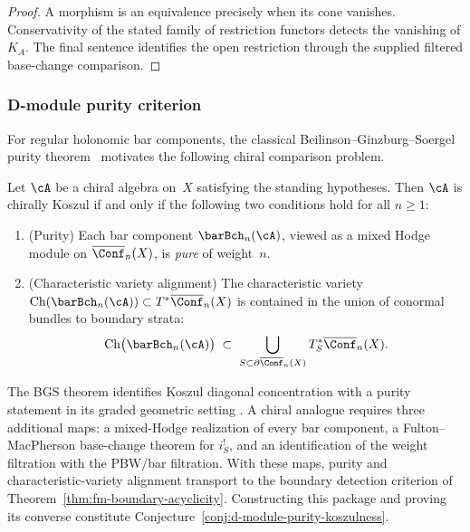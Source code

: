 \begin{proof}
A morphism is an equivalence precisely when its cone vanishes.
Conservativity of the stated family of restriction functors detects
the vanishing of \(K_A\).  The final sentence identifies the open
restriction through the supplied filtered base-change comparison.
\end{proof}

\medskip
\medskip

\subsubsection{D-module purity criterion}

For regular holonomic bar components, the classical
Beilinson--Ginzburg--Soergel purity theorem~\cite{BGS96} motivates the
following chiral comparison problem.

\begin{conjecture}\label{conj:d-module-purity-koszulness}
Let $\cA$ be a chiral algebra on~$X$ satisfying the standing hypotheses.
Then $\cA$ is chirally Koszul if and only if the following two conditions
hold for all $n \geq 1$:
\begin{enumerate}[label=\textup{(\roman*)}]
\item \textup{(Purity)}\quad
 Each bar component $\barBch_n(\cA)$, viewed as a mixed Hodge module on
 $\overline{\Conf}_n(X)$, is \emph{pure} of weight~$n$.
\item \textup{(Characteristic variety alignment)}\quad
 The characteristic variety
 $\operatorname{Ch}(\barBch_n(\cA)) \subset T^*\overline{\Conf}_n(X)$
 is contained in the union of conormal bundles to boundary strata:
 \[
 \operatorname{Ch}\bigl(\barBch_n(\cA)\bigr) \;\subset\;
 \bigcup_{S \subset \partial \overline{\Conf}_n(X)}
 T^*_S \overline{\Conf}_n(X).
 \]
\end{enumerate}
\end{conjecture}

\begin{remark}
\label{rem:d-module-purity-content-bci}
The BGS theorem identifies Koszul diagonal concentration with a purity
statement in its graded geometric setting
\cite{BGS96}.  A chiral analogue requires three additional maps:
a mixed-Hodge realization of every bar component, a
Fulton--MacPherson base-change theorem for \(i_S^!\), and an
identification of the weight filtration with the PBW/bar filtration.
With these maps, purity and characteristic-variety alignment transport
to the boundary detection criterion of
Theorem~\ref{thm:fm-boundary-acyclicity}.  Constructing this package
and proving its converse constitute
Conjecture~\ref{conj:d-module-purity-koszulness}.
\end{remark}

